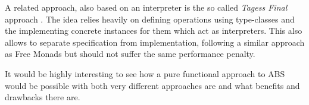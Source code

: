 
\medskip

A related approach, also based on an interpreter is the so called \textit{Tagess Final} approach \cite{kiselyov_typed_2012}. The idea relies heavily on defining operations using type-classes and the implementing concrete instances for them which act as interpreters. This also allows to separate specification from implementation, following a similar approach as Free Monads but should not suffer the same performance penalty. %

\medskip

It would be highly interesting to see how a pure functional approach to ABS would be possible with both very different approaches are and what benefits and drawbacks there are.


	
